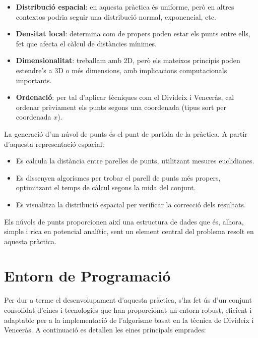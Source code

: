 \documentclass{ieeetj}
\begin{document}
\begin{itemize}
    \item \textbf{Distribució espacial}: en aquesta pràctica és uniforme, però en altres contextos podria seguir una distribució normal, exponencial, etc.
    \item \textbf{Densitat local}: determina com de propers poden estar els punts entre ells, fet que afecta el càlcul de distàncies mínimes.
    \item \textbf{Dimensionalitat}: treballam amb 2D, però els mateixos principis poden estendre’s a 3D o més dimensions, amb implicacions computacionals importants.
    \item \textbf{Ordenació}: per tal d’aplicar tècniques com el Divideix i Venceràs, cal ordenar prèviament els punts segons una coordenada (tipus sort per coordenada \(x\)).
\end{itemize}

La generació d’un núvol de punts és el punt de partida de la pràctica. A partir d’aquesta representació espacial:
\begin{itemize}
    \item Es calcula la distància entre parelles de punts, utilitzant mesures euclidianes.
    \item Es dissenyen algorismes per trobar el parell de punts més propers, optimitzant el temps de càlcul segons la mida del conjunt.
    \item Es visualitza la distribució espacial per verificar la correcció dels resultats.
\end{itemize}

Els núvols de punts proporcionen així una estructura de dades que és, alhora, simple i rica en potencial analític, sent un element central del problema resolt en aquesta pràctica.

\section{Entorn de Programació}

Per dur a terme el desenvolupament d’aquesta pràctica, s’ha fet ús d’un conjunt consolidat d’eines i tecnologies que han proporcionat un entorn robust, eficient i adaptable per a la implementació de l’algorisme basat en la tècnica de Divideix i Venceràs. A continuació es detallen les eines principals emprades:
\end{document}
